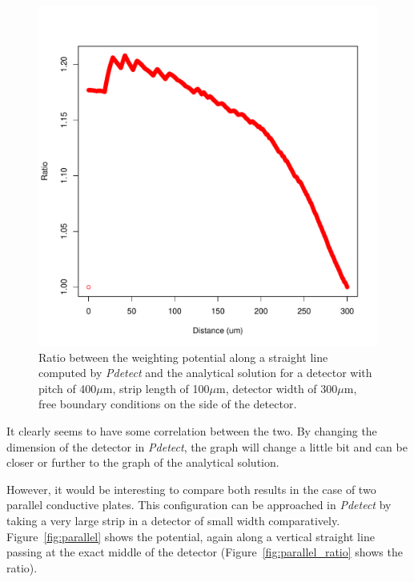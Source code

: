 \documentclass[11pt]{article}
\begin{document}
\begin{figure}[H]
\begin{minipage}[b]{.46\linewidth}
				\includegraphics[scale=0.45]{images/boundary_conditions/semi-free_ratio.pdf}
				\caption{Ratio between the weighting potential along a straight line
						computed by \textit{Pdetect} and the analytical solution for a detector with pitch
						of 400$\mu$m, strip length of 100$\mu$m, detector width of 300$\mu$m, free boundary conditions
						on the side of the detector.}
				\label{fig:semi_free_ratio}
			\end{minipage}
		\end{figure}

		It clearly seems to have some correlation between the two. By changing the dimension of the detector
		in \textit{Pdetect}, the graph will change a little bit and can be closer or further to the graph of the
		analytical solution.

		However, it would be interesting to compare both results in the case of two parallel conductive plates.
		This configuration can be approached in \textit{Pdetect} by taking a very large strip in a detector of small
		width comparatively. Figure~\ref{fig:parallel} shows the potential, again along a vertical straight line passing
		at the exact middle of the detector (Figure~\ref{fig:parallel_ratio} shows the ratio).
\end{document}
